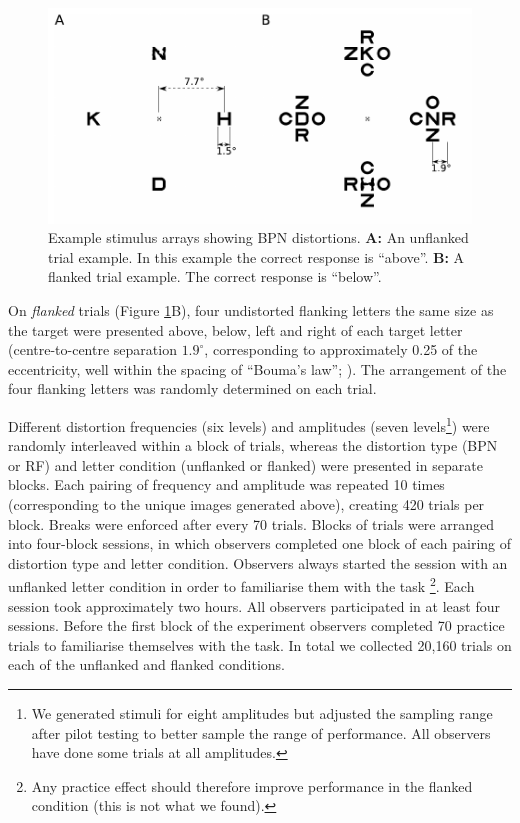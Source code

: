 \documentclass[doc, 11pt,a4paper,natbib]{apa6}\usepackage[]{graphicx}\usepackage[]{color}
\begin{document}
\begin{figure}
	\centering
   \includegraphics[scale=1]{../figures/procedure_display.pdf}
   \caption{
	Example stimulus arrays showing BPN distortions.
	\textbf{A:} An unflanked trial example. In this example the correct response is ``above''.
	\textbf{B:} A flanked trial example. The correct response is ``below''.
   }
   \label{fig:procedure}
\end{figure}

On \textit{flanked} trials (Figure \ref{fig:procedure}B), four undistorted flanking letters the same size as the target were presented above, below, left and right of each target letter (centre-to-centre separation $1.9^\circ$, corresponding to approximately 0.25 of the eccentricity, well within the spacing of ``Bouma's law''; \citet{bouma_interaction_1970}).
The arrangement of the four flanking letters was randomly determined on each trial.

Different distortion frequencies (six levels) and amplitudes (seven levels\footnote{
We generated stimuli for eight amplitudes but adjusted the sampling range after pilot testing to better sample the range of performance.
All observers have done some trials at all amplitudes.
}) were randomly interleaved within a block of trials, whereas the distortion type (BPN or RF) and letter condition (unflanked or flanked) were presented in separate blocks.
Each pairing of frequency and amplitude was repeated 10 times (corresponding to the unique images generated above), creating 420 trials per block.
Breaks were enforced after every 70 trials.
Blocks of trials were arranged into four-block sessions, in which observers completed one block of each pairing of distortion type and letter condition.
Observers always started the session with an unflanked letter condition in order to familiarise them with the task \footnote{Any practice effect should therefore improve performance in the flanked condition (this is not what we found).}.
Each session took approximately two hours.
All observers participated in at least four sessions.
Before the first block of the experiment observers completed 70 practice trials to familiarise themselves with the task.
In total we collected 20,160 trials on each of the unflanked and flanked conditions.
\end{document}
